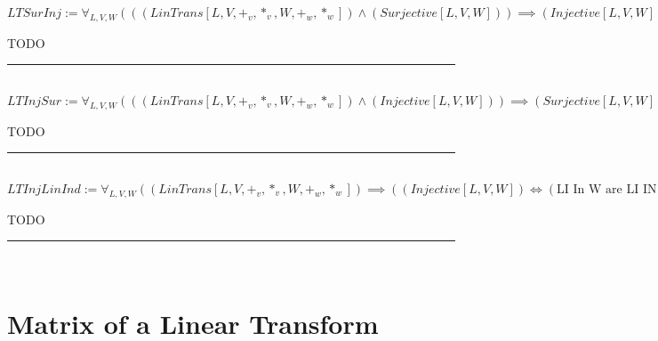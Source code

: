 \documentclass{book}
\newcommand{\abr}{:=}
\newcommand{\pr}[1]{\left(#1\right)}
\begin{document}
$LTSurInj \abr \forall_{L, V, W}\pr{\pr{(LinTrans[L, V, +_v, *_v, W, +_w, *_w]) \land (Surjective[L, V, W])} \implies (Injective[L, V, W])}$
\begin{enumerate}
  \lit TODO
\end{enumerate} \vspace{.75mm} \hrule \vspace{.75mm} \ \\ 

$LTInjSur \abr \forall_{L, V, W}\pr{\pr{(LinTrans[L, V, +_v, *_v, W, +_w, *_w]) \land (Injective[L, V, W])} \implies (Surjective[L, V, W])}$
\begin{enumerate}
  \lit TODO
\end{enumerate} \vspace{.75mm} \hrule \vspace{.75mm} \ \\ 

$LTInjLinInd \abr \forall_{L, V, W}\pr{(LinTrans[L, V, +_v, *_v, W, +_w, *_w]) \implies \pr{(Injective[L, V, W]) \iff (\text{LI In W are LI IN V})}}$
\begin{enumerate}
  \lit TODO
\end{enumerate} \vspace{.75mm} \hrule \vspace{.75mm} \ \\ 

\section{Matrix of a Linear Transform}





\end{document}
